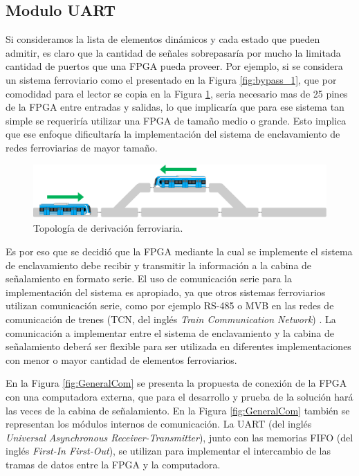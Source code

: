 \subsection{Modulo UART}
\label{sec:UART}
	Si consideramos la lista de elementos dinámicos y cada estado que pueden admitir, es claro que la cantidad de señales sobrepasaría por mucho la limitada cantidad de puertos que una FPGA pueda proveer. Por ejemplo, si se considera un sistema ferroviario como el presentado en la Figura \ref{fig:bypass_1}, que por comodidad para el lector se copia en la Figura \ref{fig:bypass_3}, seria necesario mas de 25 pines de la FPGA entre entradas y salidas, lo que implicaría que para ese sistema tan simple se requeriría utilizar una FPGA de tamaño medio o grande. Esto implica que ese enfoque dificultaría la implementación del sistema de enclavamiento de redes ferroviarias de mayor tamaño.
	
	\begin{figure}[H]
		\centering
		\includegraphics[width=1\textwidth]{Figuras/bypass}
		\centering\caption{Topología de derivación ferroviaria.}
		\label{fig:bypass_3}
	\end{figure}
	
	Es por eso que se decidió que la FPGA mediante la cual se implemente el sistema de enclavamiento debe recibir y transmitir la información a la cabina de señalamiento en formato serie. El uso de comunicación serie para la implementación del sistema es apropiado, ya que otros sistemas ferroviarios utilizan comunicación serie, como por ejemplo RS-485 o MVB en las redes de comunicación de trenes (TCN, del inglés \textit{Train Communication Network}) \cite{TCN}. La comunicación a implementar entre el sistema de enclavamiento y la cabina de señalamiento deberá ser flexible para ser utilizada en diferentes implementaciones con menor o mayor cantidad de elementos ferroviarios.
	
	En la Figura \ref{fig:GeneralCom} se presenta la propuesta de conexión de la FPGA con una computadora externa, que para el desarrollo y prueba de la solución hará las veces de la cabina de señalamiento. En la Figura \ref{fig:GeneralCom} también se representan los módulos internos de comunicación. La UART (del inglés \textit{Universal Asynchronous Receiver-Transmitter}), junto con las memorias FIFO (del inglés \textit{First-In First-Out}), se utilizan para implementar el intercambio de las tramas de datos entre la FPGA y la computadora.
	

